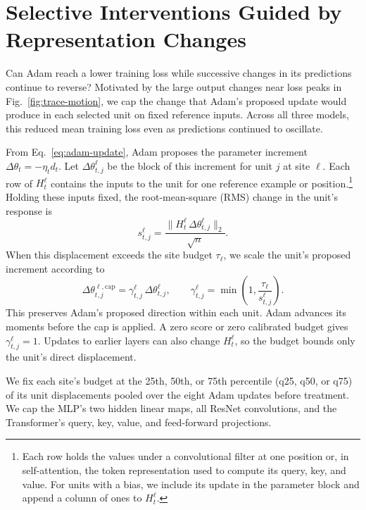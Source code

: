 \section{Selective Interventions Guided by Representation Changes}
\label{sec:vc-interventions}

Can Adam reach a lower training loss while successive changes in its predictions continue to reverse? Motivated by the large output changes near loss peaks in Fig.~\ref{fig:trace-motion}, we cap the change that Adam's proposed update would produce in each selected unit on fixed reference inputs. Across all three models, this reduced mean training loss even as predictions continued to oscillate.

From Eq.~\eqref{eq:adam-update}, Adam proposes the parameter increment $\Delta\theta_t=-\eta_t d_t$. Let $\Delta\theta_{t,j}^{\ell}$ be the block of this increment for unit $j$ at site $\ell$. Each row of $H_t^\ell$ contains the inputs to the unit for one reference example or position.\footnote{Each row holds the values under a convolutional filter at one position or, in self-attention, the token representation used to compute its query, key, and value. For units with a bias, we include its update in the parameter block and append a column of ones to $H_t^\ell$.} Holding these inputs fixed, the root-mean-square (RMS) change in the unit's response is
\begin{equation}
 s_{t,j}^{\ell}=\frac{\|H_t^\ell\,\Delta\theta_{t,j}^{\ell}\|_2}{\sqrt n}.
 \label{eq:vc-score}
\end{equation}
When this displacement exceeds the site budget $\tau_\ell$, we scale the unit's proposed increment according to
\begin{equation}
 \Delta\theta_{t,j}^{\ell,\mathrm{cap}}
 =\gamma_{t,j}^{\ell}\,\Delta\theta_{t,j}^{\ell},\qquad
 \gamma_{t,j}^{\ell}=\min\!\left(1,\frac{\tau_\ell}{s_{t,j}^{\ell}}\right).
 \label{eq:vc-cap}
\end{equation}
This preserves Adam's proposed direction within each unit. Adam advances its moments before the cap is applied. A zero score or zero calibrated budget gives $\gamma_{t,j}^{\ell}=1$. Updates to earlier layers can also change $H_t^\ell$, so the budget bounds only the unit's direct displacement.

We fix each site's budget at the 25th, 50th, or 75th percentile (q25, q50, or q75) of its unit displacements pooled over the eight Adam updates before treatment. We cap the MLP's two hidden linear maps, all ResNet convolutions, and the Transformer's query, key, value, and feed-forward projections.

